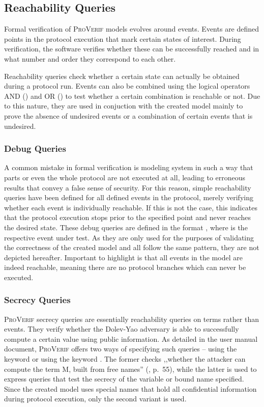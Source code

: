 \subsection{Reachability Queries}

Formal verification of \textsc{ProVerif} models evolves around events.
Events are defined points in the protocol execution that mark certain states of interest.
During verification, the software verifies whether these can be successfully reached and in what number and order they correspond to each other.

Reachability queries check whether a certain state can actually be obtained during a protocol run.
Events can also be combined using the logical operators AND ({\sffamily{\&\&}}) and OR ({\sffamily{||}}) to test whether a certain combination is reachable or not.
Due to this nature, they are used in conjuction with the created model mainly to prove the absence of undesired events or a combination of certain events that is undesired.

\subsubsection{Debug Queries}
\label{ssec:debug}

A common mistake in formal verification is modeling system in such a way that parts or even the whole protocol are not executed at all, leading to erroneous results that convey a false sense of security.
For this reason, simple reachability queries have been defined for all defined events in the protocol, merely verifying whether each event is individually reachable.
If this is not the case, this indicates that the protocol execution stops prior to the specified point and never reaches the desired state.
These debug queries are defined in the format {}, where {} is the respective event under test.
As they are only used for the purposes of validating the correctness of the created model and all follow the same pattern, they are not depicted hereafter.
Important to highlight is that all events in the model are indeed reachable, meaning there are no protocol branches which can never be executed.

\subsubsection{Secrecy Queries}
\label{ssec:secrecy}

\textsc{ProVerif} secrecy queries are essentially reachability queries on terms rather than events.
They verify whether the Dolev-Yao adversary is able to successfully compute a certain value using public information.
As detailed in the user manual document, \textsc{ProVerif} offers two ways of specifying such queries -- using the keyword {} or using the keyword {}.
The former checks ,,whether the attacker can compute the term M, built from free names'' (\cite{blanchet2020proverif}, p.~55), while the latter is used to express queries that test the secrecy of the variable or bound name specified.
Since the created model uses special names that hold all confidential information during protocol execution, only the second variant is used.

